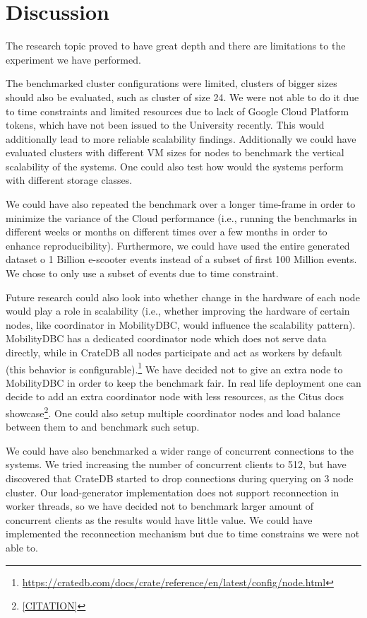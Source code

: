 \section{Discussion}
\label{cha:discussion}

The research topic proved to have great depth and there are limitations to the experiment we have performed.

The benchmarked cluster configurations were limited, clusters of bigger sizes should also be evaluated, such as cluster of size 24.
We were not able to do it due to time constraints and limited resources due to lack of Google Cloud Platform tokens, which have not been issued to the University recently.
This would additionally lead to more reliable scalability findings.
Additionally we could have evaluated clusters with different VM sizes for nodes to benchmark the vertical scalability of the systems.
One could also test how would the systems perform with different storage classes.

We could have also repeated the benchmark over a longer time-frame in order to minimize the variance of the Cloud performance
(i.e., running the benchmarks in different weeks or months on different times over a few months in order to enhance reproducibility).
Furthermore, we could have used the entire generated dataset o 1 Billion e-scooter events instead of a subset of first 100 Million events.
We chose to only use a subset of events due to time constraint.

Future research could also look into whether change in the hardware of each node would play a role in scalability
(i.e., whether improving the hardware of certain nodes, like coordinator in MobilityDBC, would influence the scalability pattern).
MobilityDBC has a dedicated coordinator node which does not serve data directly, while in CrateDB all nodes participate and act as workers by default (this behavior is configurable).\footnote{\url{https://cratedb.com/docs/crate/reference/en/latest/config/node.html}}
We have decided not to give an extra node to MobilityDBC in order to keep the benchmark fair.
In real life deployment one can decide to add an extra coordinator node with less resources, as the Citus docs showcase\footnote{\url{[CITATION]}}.
One could also setup multiple coordinator nodes and load balance between them to and benchmark such setup.

We could have also benchmarked a wider range of concurrent connections to the systems.
We tried increasing the number of concurrent clients to 512, but have discovered that CrateDB started to drop connections during querying on 3 node cluster.
Our load-generator implementation does not support reconnection in worker threads, so we have decided not to benchmark larger amount of concurrent clients as the results would have little value.
We could have implemented the reconnection mechanism but due to time constrains we were not able to.

